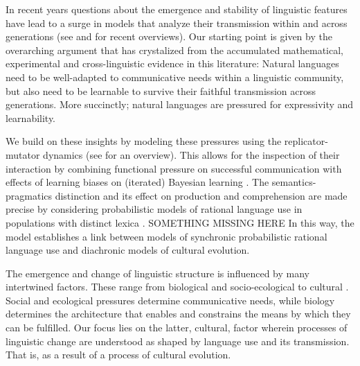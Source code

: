 \documentclass[a4paper]{article}
\newcommand{\hl}[1]{\textcolor[rgb]{.8,.33,.0}{#1}}%
\begin{document}
In recent years questions about the emergence and stability of linguistic features have lead to a surge in models that analyze their transmission within and across generations (see \citealt{steels:2015} and \citealt{tamariz+kirby:2016} for recent overviews). Our starting point is given by the overarching argument that has crystalized from the accumulated mathematical, experimental and cross-linguistic evidence in this literature: Natural languages need to be well-adapted to communicative needs within a linguistic community, but also need to be learnable to survive their faithful transmission across generations. More succinctly; natural languages are pressured for expressivity and learnability.   

We build on these insights by modeling these pressures using the replicator-mutator dynamics (see \citealt{hofbauer+sigmund:2003} for an overview). This allows for the inspection of their interaction by combining functional pressure on successful communication with effects of learning biases on (iterated) Bayesian learning \citep{griffiths+kalish:2007}. The semantics-pragmatics distinction and its effect on production and comprehension are made precise by considering probabilistic models of rational language use in populations with distinct lexica \citep{frank+goodman:2012,franke+jaeger:2014, bergen+etal:2016}. \hl{SOMETHING MISSING HERE} \hl{In this way, the model establishes a link between models of synchronic probabilistic rational language use and diachronic models of cultural evolution. }


The emergence and change of linguistic structure is influenced by many intertwined factors. These range from biological and socio-ecological to cultural \citep{steels:2011,tamariz+kirby:2016}. Social and ecological pressures determine communicative needs, while biology determines the architecture that enables and constrains the means by which they can be fulfilled. Our focus lies on the latter, cultural, factor wherein processes of linguistic change are understood as shaped by language use and its transmission. That is, as a result of a process of cultural evolution.
\end{document}
